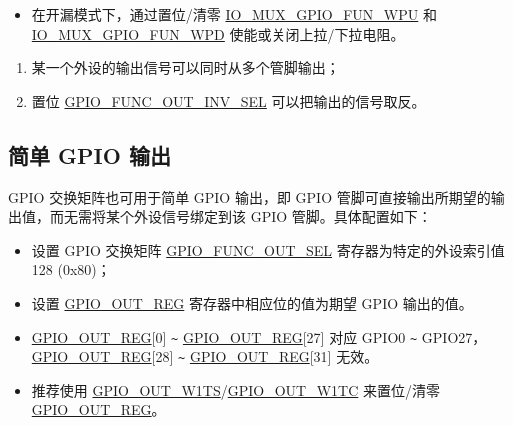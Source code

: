 \documentclass[main\_\_CN.tex]{subfiles}
\begin{document}
\begin{enumerate}
\begin{itemize}
        \item 在开漏模式下，通过置位/清零 \hyperref[fielddesc:IOMUXGPIONFUNWPU]{IO\_MUX\_GPIO\_FUN\_WPU} 和 \hyperref[fielddesc:IOMUXGPIONFUNWPD]{IO\_MUX\_GPIO\_FUN\_WPD} 使能或关闭上拉/下拉电阻。
    \end{itemize}
\end{enumerate}

\begin{tiplisting}
\vspace{-2em}
\begin{enumerate}
\item \label{output-note-1} 某一个外设的输出信号可以同时从多个管脚输出；
\item \label{output-note-2} 置位 \hyperref[fielddesc:GPIOFUNCNOUTINVSEL]{GPIO\_FUNC\_OUT\_INV\_SEL} 可以把输出的信号取反。
\end{enumerate}
\end{tiplisting}

\subsection{简单 GPIO 输出}

GPIO 交换矩阵也可用于简单 GPIO 输出，即 GPIO 管脚可直接输出所期望的输出值，而无需将某个外设信号绑定到该 GPIO 管脚。具体配置如下：

\begin{itemize}
    \item 设置 GPIO 交换矩阵 \hyperref[fielddesc:GPIOFUNCNOUTSEL]{GPIO\_FUNC\_OUT\_SEL} 寄存器为特定的外设索引值 128 (0x80)；
    \item 设置 \hyperref[regdesc:GPIOOUTREG]{GPIO\_OUT\_REG} 寄存器中相应位的值为期望 GPIO 输出的值。
\end{itemize}

\begin{tiplisting}
\vspace{-2em}
\begin{itemize}
\item \hyperref[regdesc:GPIOOUTREG]{GPIO\_OUT\_REG}[0] \verb+~+ \hyperref[regdesc:GPIOOUTREG]{GPIO\_OUT\_REG}[27] 对应 GPIO0 \verb+~+ GPIO27， \hyperref[regdesc:GPIOOUTREG]{GPIO\_OUT\_REG}[28] \verb+~+ \hyperref[regdesc:GPIOOUTREG]{GPIO\_OUT\_REG}[31] 无效。
\item 推荐使用 \hyperref[fielddesc:GPIOOUTW1TS]{GPIO\_OUT\_W1TS}/\hyperref[fielddesc:GPIOOUTW1TC]{GPIO\_OUT\_W1TC} 来置位/清零 \hyperref[regdesc:GPIOOUTREG]{GPIO\_OUT\_REG}。
\end{itemize}
\end{tiplisting}
\end{document}
